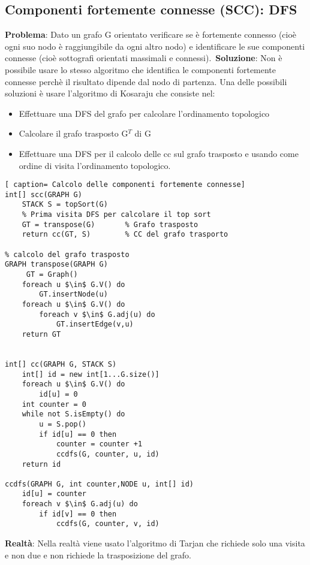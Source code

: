 \documentclass[../cheatSheetAlgoritmi.tex]{subfiles}
\begin{document}
\subsection{Componenti fortemente connesse (SCC): DFS}
\textbf{Problema}: Dato un grafo G orientato verificare se è fortemente connesso (cioè  ogni suo nodo è raggiungibile da ogni altro nodo) e identificare le sue componenti connesse (cioè sottografi orientati massimali e connessi).\
\textbf{Soluzione}: Non è possibile usare lo stesso algoritmo che identifica le componenti fortemente connesse perchè il risultato dipende dal nodo di partenza. Una delle possibili soluzioni è usare l'algoritmo di Kosaraju che consiste nel:
\begin{itemize}
	\item Effettuare una DFS del grafo per calcolare l'ordinamento topologico
	\item Calcolare il grafo trasposto G$^{T}$ di G
	\item Effettuare una DFS per il calcolo delle cc sul grafo trasposto e usando come ordine di visita l'ordinamento topologico. 
\end{itemize} 
\newpage
\begin{lstlisting}[ caption= Calcolo delle componenti fortemente connesse]
int[] scc(GRAPH G)
	STACK S = topSort(G) 	
	% Prima visita DFS per calcolare il top sort
	GT = transpose(G)		% Grafo trasposto
	return cc(GT, S)		% CC del grafo trasporto
	
% calcolo del grafo trasposto
GRAPH transpose(GRAPH G)
	 GT = Graph()
	foreach u $\in$ G.V() do
		GT.insertNode(u)
	foreach u $\in$ G.V() do
		foreach v $\in$ G.adj(u) do
			GT.insertEdge(v,u)
	return GT


int[] cc(GRAPH G, STACK S)
	int[] id = new int[1...G.size()]
	foreach u $\in$ G.V() do
		id[u] = 0
	int counter = 0
	while not S.isEmpty() do
		u = S.pop()
		if id[u] == 0 then
			counter = counter +1
			ccdfs(G, counter, u, id)
	return id
	
ccdfs(GRAPH G, int counter,NODE u, int[] id)
	id[u] = counter
	foreach v $\in$ G.adj(u) do
		if id[v] == 0 then
			ccdfs(G, counter, v, id)
\end{lstlisting}
\textbf{Realtà}: Nella realtà viene usato l'algoritmo di Tarjan che richiede solo una visita e non due e non richiede la trasposizione del grafo.

\newpage
\end{document}

